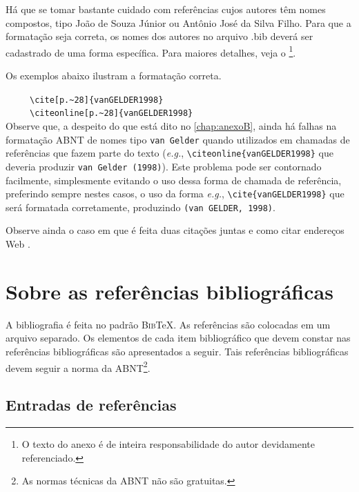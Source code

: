 \begin{apendicesenv}
Há que se tomar bastante cuidado com referências cujos autores têm nomes compostos, tipo João de Souza Júnior ou Antônio José da Silva Filho. Para que a formatação seja correta, os nomes dos autores no arquivo {\ttfamily .bib} deverá ser cadastrado de uma forma específica. Para maiores detalhes, veja o  \footnote{O texto do anexo é de inteira responsabilidade do autor devidamente referenciado.}.

Os exemplos abaixo ilustram a formatação correta.

\cite[p.~28]{vanGELDER1998} \ \ \ \ \  \verb|\cite[p.~28]{vanGELDER1998}|\\
 \ \ \ \ \  \verb|\citeonline[p.~28]{vanGELDER1998}|\\

Observe que, a despeito do que está dito no \autoref{chap:anexoB}, ainda há falhas na formatação ABNT de nomes tipo \verb|van Gelder| quando utilizados em chamadas de referências que fazem parte do texto (\textit{e.g.}, \verb|\citeonline{vanGELDER1998}| que deveria produzir \verb|van Gelder (1998)|). Este problema pode ser contornado facilmente, simplesmente evitando o uso dessa forma de chamada de referência, preferindo sempre nestes casos, o uso da forma \textit{e.g.}, \verb|\cite{vanGELDER1998}| que será formatada corretamente, produzindo \verb|(van GELDER, 1998)|.

Observe ainda o caso em que é feita duas citações juntas \cite{Santos2003, Neubert2001} e como citar endereços Web \cite{IRL2014}.


\chapter{Sobre as referências bibliográficas}
\label{chap:apSobreRefer}

A bibliografia é feita no padrão \textsc{Bib}\TeX{}. As referências são colocadas em um arquivo separado. Os elementos de cada item bibliográfico que devem constar nas referências  bibliográficas são apresentados a seguir. Tais referências bibliográficas devem seguir a norma  da ABNT\footnote{As normas técnicas da ABNT não são gratuitas.}.

\section{Entradas de referências}
\label{sec:entradasRefs}


\end{apendicesenv}
